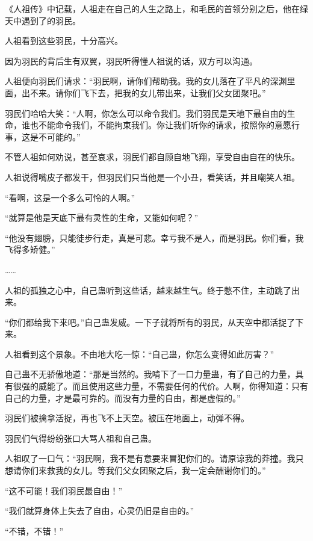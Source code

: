 
\begin{this_body}

《人祖传》中记载，人祖走在自己的人生之路上，和毛民的首领分别之后，他在绿天中遇到了的羽民。

人祖看到这些羽民，十分高兴。

因为羽民的背后生有双翼，羽民听得懂人祖说的话，双方可以沟通。

人祖便向羽民们请求：“羽民啊，请你们帮助我。我的女儿落在了平凡的深渊里面，出不来。请你们飞下去，把我的女儿带出来，让我们父女团聚吧。”

羽民们哈哈大笑：“人啊，你怎么可以命令我们。我们羽民是天地下最自由的生命，谁也不能命令我们，不能拘束我们。你让我们听你的请求，按照你的意愿行事，这是不可能的。”

不管人祖如何劝说，甚至哀求，羽民们都自顾自地飞翔，享受自由自在的快乐。

人祖说得嘴皮子都发干，但羽民们只当他是一个小丑，看笑话，并且嘲笑人祖。

“看啊，这是一个多么可怜的人啊。”

“就算是他是天底下最有灵性的生命，又能如何呢？”

“他没有翅膀，只能徒步行走，真是可悲。幸亏我不是人，而是羽民。你们看，我飞得多矫健。”

……

人祖的孤独之心中，自己蛊听到这些话，越来越生气。终于憋不住，主动跳了出来。

“你们都给我下来吧。”自己蛊发威。一下子就将所有的羽民，从天空中都活捉了下来。

人祖看到这个景象。不由地大吃一惊：“自己蛊，你怎么变得如此厉害？”

自己蛊不无骄傲地道：“那是当然的。我啃下了一口力量蛊，有了自己的力量，具有很强的威能了。而且使用这些力量，不需要任何的代价。人啊，你得知道：只有自己的力量，才是最可靠的。而没有力量的自由，都是虚假的。”

羽民们被擒拿活捉，再也飞不上天空。被压在地面上，动弹不得。

羽民们气得纷纷张口大骂人祖和自己蛊。

人祖叹了一口气：“羽民啊，我不是有意要来冒犯你们的。请原谅我的莽撞。我只想请你们来救我的女儿。等我们父女团聚之后，我一定会酬谢你们的。”

“这不可能！我们羽民最自由！”

“我们就算身体上失去了自由，心灵仍旧是自由的。”

“不错，不错！”


\end{this_body}
